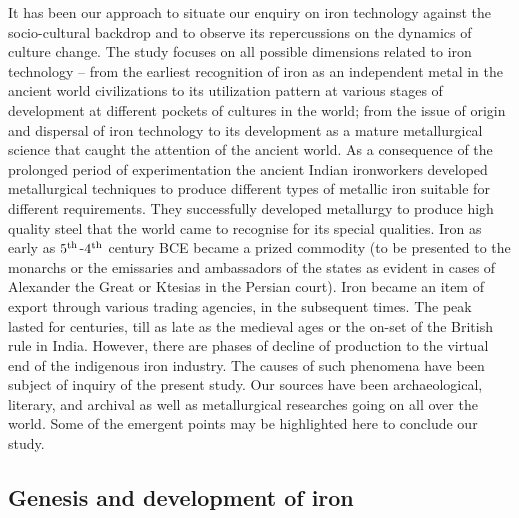 It has been our approach to situate our enquiry on iron technology against the socio-cultural backdrop and to observe its repercussions on the dynamics of culture change. The study focuses on all possible dimensions related to iron technology – from the earliest recognition of iron as an independent metal in the ancient world civilizations to its utilization pattern at various stages of development at different pockets of cultures in the world; from the issue of origin and dispersal of iron technology to its development as a mature metallurgical science that caught the attention of the ancient world. As a consequence of the prolonged period of experimentation the ancient Indian ironworkers developed metallurgical techniques to produce different types of metallic iron suitable for different requirements. They successfully developed metallurgy to produce high quality steel that the world came to recognise for its special qualities. Iron as early as $5^{\rm th}$-$4^{\rm th}$ century BCE became a prized commodity (to be presented to the monarchs or the emissaries and ambassadors of the states as evident in cases of Alexander the Great or Ktesias in the Persian court). Iron became an item of export through various trading agencies, in the subsequent times. The peak lasted for centuries, till as late as the medieval ages or the on-set of the British rule in India. However, there are phases of decline of production to the virtual end of the indigenous iron industry. The causes of such phenomena have been subject of inquiry of the present study. Our sources have been archaeological, literary, and archival as well as metallurgical researches going on all over the world. Some of the emergent points may be highlighted here to conclude our study.

\vspace{-.3cm}

\subsection*{Genesis and development of iron}\label{chapter8-subsection-1}

\vspace{-.2cm}

